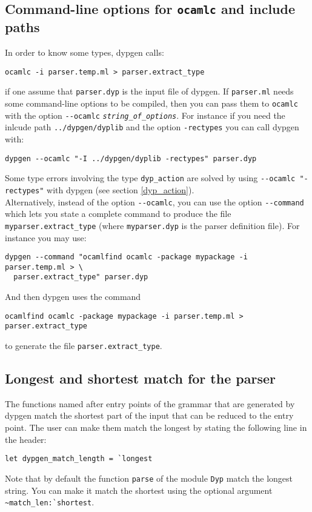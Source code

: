 \documentclass[12pt]{article}
\begin{document}
{\subsection{Command-line options for \texttt{ocamlc} and include paths}\label{ocamlc}

In order to know some types, dypgen calls:
\begin{verbatim}
ocamlc -i parser.temp.ml > parser.extract_type
\end{verbatim}
if one assume that \verb|parser.dyp| is the input file of dypgen. If \verb|parser.ml| needs some command-line options to be compiled, then you can pass them to \verb|ocamlc| with the option \verb|--ocamlc| \texttt{\emph{string\_of\_options}}. For instance if you need the inlcude path \verb|../dypgen/dyplib| and the option \verb|-rectypes| you can call dypgen with:
\begin{verbatim}
dypgen --ocamlc "-I ../dypgen/dyplib -rectypes" parser.dyp
\end{verbatim}

Some type errors involving the type \verb|dyp_action| are solved by using \verb|--ocamlc "-rectypes"| with dypgen (see section \ref{dyp_action}).\\

Alternatively, instead of the option \verb|--ocamlc|, you can use the option \verb|--command| which lets you state a complete command to produce the file \verb|myparser.extract_type| (where \verb|myparser.dyp| is the parser definition file). For instance you may use:
\begin{verbatim}
dypgen --command "ocamlfind ocamlc -package mypackage -i parser.temp.ml > \
  parser.extract_type" parser.dyp
\end{verbatim}
And then dypgen uses the command
\begin{verbatim}
ocamlfind ocamlc -package mypackage -i parser.temp.ml > parser.extract_type
\end{verbatim}
to generate the file \verb|parser.extract_type|.

\subsection{Longest and shortest match for the parser}\label{match_length}

The functions named after entry points of the grammar that are generated by dypgen match the shortest part of the input that can be reduced to the entry point. The user can make them match the longest by stating the following line in the header:
\begin{verbatim}
let dypgen_match_length = `longest
\end{verbatim}
Note that by default the function \verb|parse| of the module \verb|Dyp| match the longest string. You can make it match the shortest using the optional argument \verb|~match_len:`shortest|.\\

}
\end{document}
